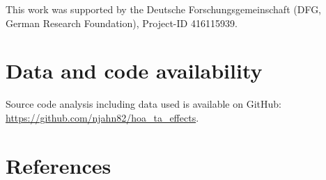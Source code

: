 \documentclass[a4paper,man,floatsintext,longtable,noextraspace,12pt]{apa6}
\begin{document}
This work was supported by the Deutsche Forschungsgemeinschaft (DFG,
German Research Foundation), Project-ID 416115939.

\section*{Data and code availability}\label{data-and-code-availability}

Source code analysis including data used is available on GitHub:
\url{https://github.com/njahn82/hoa_ta_effects}.

\section*{References}\label{references}
\end{document}
